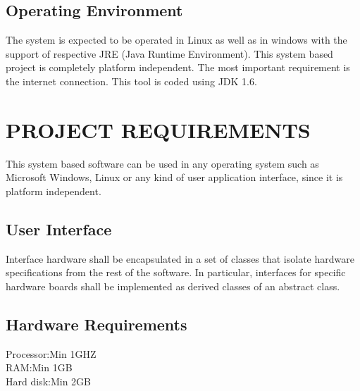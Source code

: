 \documentclass[12pt,a4paper,oneside]{report}
\begin{document}
 
\section{Operating Environment}
The system is expected to be operated in Linux as well as in windows with the support of
respective JRE (Java Runtime Environment). This system based project is completely platform
independent. The most important requirement is the internet connection. This tool is coded
using JDK 1.6.

\chapter{PROJECT REQUIREMENTS}
\par
This system based software can be used in any operating system such as Microsoft Windows, Linux or any kind of user application interface, since it is platform independent.
\section{User Interface}
Interface hardware shall be encapsulated in a set of classes that isolate hardware specifications from the rest of the software. In particular, interfaces for specific hardware boards shall be implemented as derived classes of an abstract class.
\
\section{Hardware Requirements}   

  Processor\hspace{.54in}:\hspace{.54in}Min 1GHZ\\

 RAM\hspace{.8in}:\hspace{.54in}Min 1GB\\
 
 Hard disk\hspace{.55in}:\hspace{.54in}Min 2GB\\
 
 
 
\end{document}

